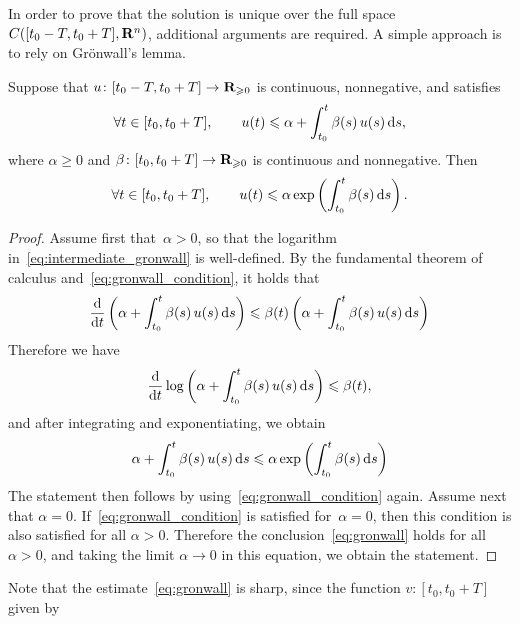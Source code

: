 In order to prove that the solution is unique over the full space $C([t_0-T, t_0+T], \mathbf R^n)$,
additional arguments are required.
A simple approach is to rely on Gr\"onwall's lemma.
\begin{lemma}
    Suppose that $u \colon [t_0-T, t_0+T] \to \mathbf R_{\geqslant 0}$ is continuous, nonnegative, and satisfies
    \begin{equation}
        \label{eq:gronwall_condition}
        \forall t \in [t_0, t_0+T], \qquad
        u(t) \leqslant \alpha + \int_{t_0}^{t} \beta(s) \, u(s) \, \mathrm d s,
    \end{equation}
    where $\alpha \geq 0$ and $\beta\colon [t_0, t_0 + T] \to \mathbf R_{\geqslant 0}$ is continuous and nonnegative.
    Then
    \begin{equation}
        \label{eq:gronwall}
        \forall t \in [t_0, t_0+T], \qquad
        u(t) \leqslant \alpha \exp \left( \int_{t_0}^{t} \beta(s) \, \mathrm d s \right).
    \end{equation}
\end{lemma}
\begin{proof}
    Assume first that~$\alpha > 0$,
    so that the logarithm in~\eqref{eq:intermediate_gronwall} is well-defined.
    By the fundamental theorem of calculus and~\eqref{eq:gronwall_condition},
    it holds that
    \[
        \frac{\mathrm d}{\mathrm d t} \left( \alpha + \int_{t_0}^{t} \beta(s) \, u(s) \, \mathrm d s \right)
        \leqslant \beta(t) \left( \alpha + \int_{t_0}^{t} \beta(s) \, u(s) \, \mathrm d s \right)
    \]
    Therefore we have
    \begin{equation}
        \label{eq:intermediate_gronwall}
        \frac{\mathrm d}{\mathrm d t} \log \left( \alpha + \int_{t_0}^{t} \beta(s) \, u(s) \, \mathrm d s \right) \leqslant \beta(t),
    \end{equation}
    and after integrating and exponentiating,
    we obtain
    \[
        \alpha + \int_{t_0}^{t} \beta(s) \, u(s) \, \mathrm d s
        \leqslant \alpha \exp \left( \int_{t_0}^{t} \beta(s) \, \mathrm d s \right)
    \]
    The statement then follows by using~\eqref{eq:gronwall_condition} again.
    Assume next that $\alpha = 0$.
    If~\eqref{eq:gronwall_condition} is satisfied for~$\alpha = 0$,
    then this condition is also satisfied for all $\alpha > 0$.
    Therefore the conclusion~\eqref{eq:gronwall} holds for all~$\alpha > 0$,
    and taking the limit $\alpha \to 0$ in this equation,
    we obtain the statement.
\end{proof}
Note that the estimate~\eqref{eq:gronwall} is sharp,
since the function $v \colon [t_0, t_0 + T]$ given by
